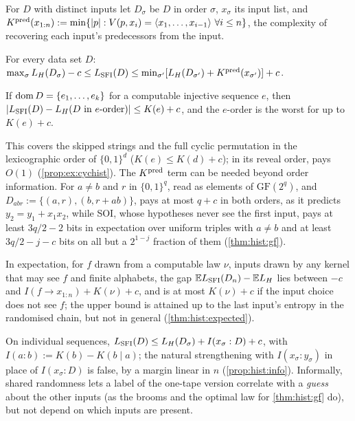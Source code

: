 For $D$ with distinct inputs let $D_\sigma$ be $D$ in order $\sigma$, $x_\sigma$ its input list, and $K^{\mathrm{pred}}(x_{1:n}):=\min\{|p|:V(p,x_i)=\langle x_1,\dots,x_{i-1}\rangle\ \forall i\le n\}$, the complexity of recovering each input's predecessors from the input.

\begin{theorem}[Sandwich]\label{thm:hist:sandwich}
For every data set $D$: $\max_\sigma L_{H}(D_\sigma)-c\le L_{\mathrm{SFI}}(D)\le\min_{\sigma'}[L_{H}(D_{\sigma'})+K^{\mathrm{pred}}(x_{\sigma'})]+c$.
\end{theorem}

\begin{corollary}\label{cor:hist:initial}
If $\operatorname{dom} D=\{e_1,\dots,e_k\}$ for a computable injective sequence $e$, then $|L_{\mathrm{SFI}}(D)-L_{H}(D\text{ in $e$-order})|\le K(e)+c$, and the $e$-order is the worst for \SFIhist{} up to $K(e)+c$.
\end{corollary}

This covers the skipped strings and the full cyclic permutation in the lexicographic order of $\{0,1\}^d$ ($K(e)\le K(d)+c$); in its reveal order, \SFIhist{} pays $O(1)$ (\cref{prop:ex:cychist}). The $K^{\mathrm{pred}}$ term can be needed beyond order information. For $a\ne b$ and $r$ in $\{0,1\}^q$, read as elements of $\mathrm{GF}(2^q)$, and $D_{abr}:=\{(a,r),(b,r+ab)\}$, \SFIhist{} pays at most $q+c$ in both orders, as it predicts $y_2=y_1+x_1x_2$, while SOI, whose hypotheses never see the first input, pays at least $3q/2-2$ bits in expectation over uniform triples with $a\ne b$ and at least $3q/2-j-c$ bits on all but a $2^{1-j}$ fraction of them (\cref{thm:hist:gf}).

In expectation, for $f$ drawn from a computable law $\nu$, inputs drawn by any kernel that may see $f$ and finite alphabets, the gap $\mathbb{E}L_{\mathrm{SFI}}(D_n)-\mathbb{E}L_{H}$ lies between $-c$ and $I(f\to x_{1:n})+K(\nu)+c$, and is at most $K(\nu)+c$ if the input choice does not see $f$; the upper bound is attained up to the last input's entropy in the randomised chain, but not in general (\cref{thm:hist:expected}).

On individual sequences, $L_{\mathrm{SFI}}(D)\le L_{H}(D_\sigma)+I(x_\sigma:D)+c$, with $I(a:b):=K(b)-K(b\mid a)$; the natural strengthening with $I(x_\sigma:y_\sigma)$ in place of $I(x_\sigma:D)$ is false, by a margin linear in $n$ (\cref{prop:hist:info}). Informally, shared randomness lets a label of the one-tape version correlate with a \emph{guess} about the other inputs (as the brooms and the optimal law for \cref{thm:hist:gf} do), but not depend on which inputs are present.

